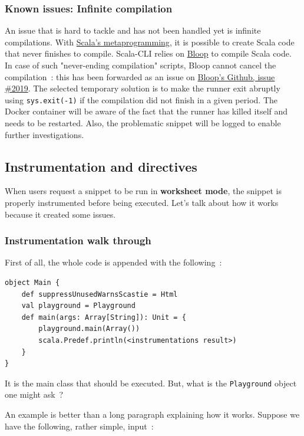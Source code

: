 \documentclass{article}
\begin{document}
\subsubsection{Known issues: Infinite compilation}

An issue that is hard to tackle and has not been handled yet is infinite compilations. With \href{https://docs.scala-lang.org/scala3/reference/metaprogramming/index.html}{Scala's metaprogramming}, it is possible to create Scala code that never finishes to compile. Scala-CLI relies on \href{https://scalacenter.github.io/bloop/}{Bloop} to compile Scala code. In case of such "never-ending compilation" scripts, Bloop cannot cancel the compilation~: this has been forwarded as an issue on \href{https://github.com/scalacenter/bloop/issues/2019}{Bloop's Github, issue \#2019}. The selected temporary solution is to make the runner exit abruptly using \lstinline{sys.exit(-1)} if the compilation did not finish in a given period. The Docker container will be aware of the fact that the runner has killed itself and needs to be restarted. Also, the problematic snippet will be logged to enable further investigations.

\subsection{Instrumentation and directives}

When users request a snippet to be run in \textbf{worksheet mode}, the snippet is properly instrumented before being executed. Let's talk about how it works because it created some issues.

\subsubsection{Instrumentation walk through}

First of all, the whole code is appended with the following~:

\begin{lstlisting}
object Main {
    def suppressUnusedWarnsScastie = Html
    val playground = Playground
    def main(args: Array[String]): Unit = {
        playground.main(Array())
        scala.Predef.println(<instrumentations result>)
    }
}
\end{lstlisting}

It is the main class that should be executed. But, what is the \lstinline{Playground} object one might ask~?

An example is better than a long paragraph explaining how it works. Suppose we have the following, rather simple, input~:
\end{document}
